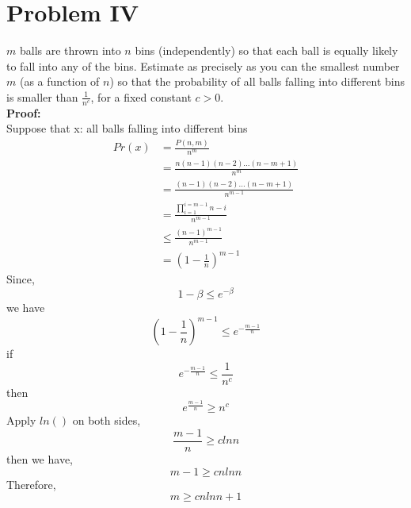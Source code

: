 \section{Problem IV}
$m$ balls are thrown into $n$ bins (independently) so that each ball is equally likely to fall into any of the bins. Estimate as precisely as you can the smallest number $m$ (as a function of $n$) so that the probability of all balls falling into different bins is smaller than $\frac{1}{n^{c}}$, for a fixed constant $c>0$.\\
\textbf{Proof:}\\
Suppose that x: all balls falling into different bins
\begin{align*}
Pr(x) &= \frac{P(n, m)}{n^m}\\
&= \frac{n(n-1)(n-2)...(n-m+1)}{n^m}\\
&= \frac{(n-1)(n-2)...(n-m+1)}{n^{m - 1}}\\
&= \frac{\prod_{i=1}^{i=m-1}n - i}{n^{m - 1}}\\
&\leq \frac{(n-1)^{m-1}}{n^{m - 1}}\\
&= (1 - \frac{1}{n})^{m - 1}
\end{align*}
Since,
$$ 1 - \beta \leq e^{-\beta} $$
we have
$$ (1 - \frac{1}{n})^{m - 1} \leq e^{-\frac{m-1}{n}} $$
if 
$$ e^{-\frac{m-1}{n}} \leq \frac{1}{n^c} $$
then
$$ e^{\frac{m-1}{n}} \geq n^c$$
Apply $ln()$ on both sides,
$$ \frac{m-1}{n} \geq clnn $$
then we have,
$$ m - 1 \geq cnlnn $$
Therefore,
$$ m \geq cnlnn + 1$$
